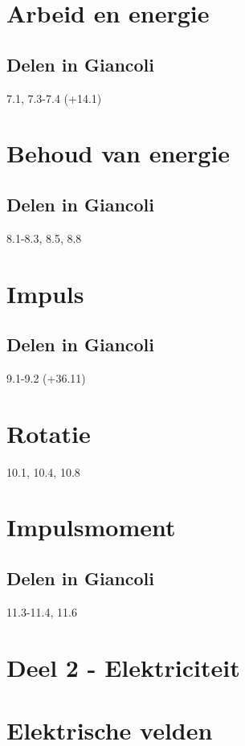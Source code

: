 \documentclass[12pt,a4paper]{article}
\begin{document}
    \section{Arbeid en energie}

    \subsection{Delen in Giancoli}
    7.1, 7.3-7.4 (+14.1)


    \section{Behoud van energie}

    \subsection{Delen in Giancoli}
    8.1-8.3, 8.5, 8.8


    \section{Impuls}

    \subsection{Delen in Giancoli}
    9.1-9.2 (+36.11)


    \section{Rotatie}
    10.1, 10.4, 10.8


    \section{Impulsmoment}

    \subsection{Delen in Giancoli}
    11.3-11.4, 11.6
    \newpage


    \section{Deel 2 - Elektriciteit}


    \section{Elektrische velden}
\end{document}
